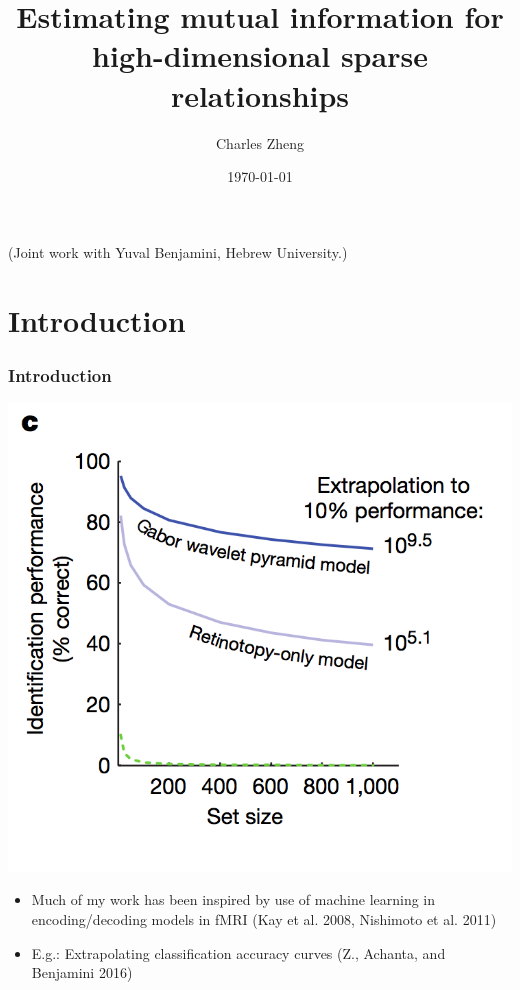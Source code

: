 \documentclass{beamer}
\title[Mutual information]{Estimating mutual information for high-dimensional sparse relationships}
\author{Charles Zheng} %
\institute[Stanford] %
{Stanford University}
\date{\today} %
\begin{document}
\begin{frame}
\titlepage %
(Joint work with Yuval Benjamini, Hebrew University.)
\end{frame}


\section{Introduction}

\begin{frame}
\frametitle{Introduction}
\begin{center}
\includegraphics[scale = 0.2, clip=true, trim = 0 0in 0 0]{kay_extrapolation.png}
\end{center}
\begin{itemize}
\item Much of my work has been inspired by use of machine learning in encoding/decoding models in fMRI (Kay et al. 2008, Nishimoto et al. 2011)\pause
\item E.g.: Extrapolating classification accuracy curves (Z., Achanta, and Benjamini 2016)
\end{itemize}
\end{frame}
\end{document}
